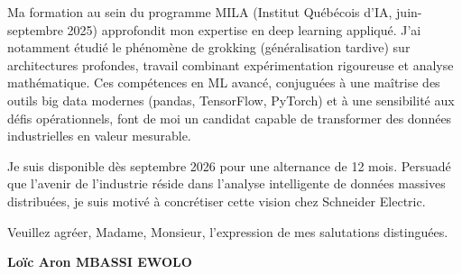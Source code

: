 \documentclass[a4paper,11pt]{article}
\begin{document}
\vspace{0.8em}
Ma formation au sein du programme MILA (Institut Québécois d'IA, juin-septembre 2025) approfondit mon expertise en deep learning appliqué. J'ai notamment étudié le phénomène de grokking (généralisation tardive) sur architectures profondes, travail combinant expérimentation rigoureuse et analyse mathématique. Ces compétences en ML avancé, conjuguées à une maîtrise des outils big data modernes (pandas, TensorFlow, PyTorch) et à une sensibilité aux défis opérationnels, font de moi un candidat capable de transformer des données industrielles en valeur mesurable.

\vspace{0.8em}
Je suis disponible dès septembre 2026 pour une alternance de 12 mois. Persuadé que l'avenir de l'industrie réside dans l'analyse intelligente de données massives distribuées, je suis motivé à concrétiser cette vision chez Schneider Electric.

\vspace{1.5em}
\noindent Veuillez agréer, Madame, Monsieur, l'expression de mes salutations distinguées.

\vspace{2em}
\noindent \textbf{Loïc Aron MBASSI EWOLO}
\end{document}
